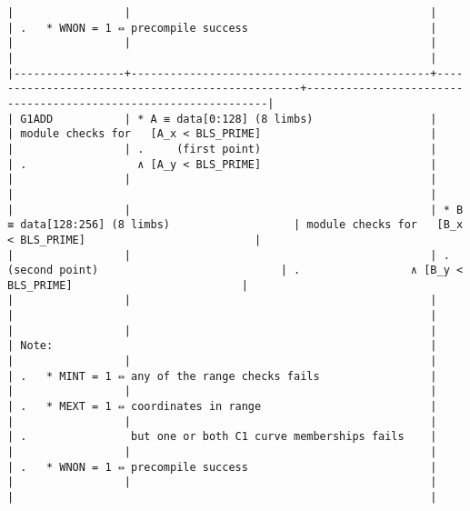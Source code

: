 \documentclass[varwidth=\maxdimen,margin=0.5cm,multi={verbatim}]{standalone}
\begin{document}
\begin{verbatim}
|                 |                                              |                                                 | .   * WNON = 1 ⇔ precompile success                            |
|                 |                                              |                                                 |                                                                |
|-----------------+----------------------------------------------+-------------------------------------------------+----------------------------------------------------------------|
| G1ADD           | * A ≡ data[0:128] (8 limbs)                  |                                                 | module checks for   [A_x < BLS_PRIME]                          |
|                 | .     (first point)                          |                                                 | .                 ∧ [A_y < BLS_PRIME]                          |
|                 |                                              |                                                 |                                                                |
|                 |                                              | * B ≡ data[128:256] (8 limbs)                   | module checks for   [B_x < BLS_PRIME]                          |
|                 |                                              | .     (second point)                            | .                 ∧ [B_y < BLS_PRIME]                          |
|                 |                                              |                                                 |                                                                |
|                 |                                              |                                                 | Note:                                                          |
|                 |                                              |                                                 | .   * MINT = 1 ⇔ any of the range checks fails                 |
|                 |                                              |                                                 | .   * MEXT = 1 ⇔ coordinates in range                          |
|                 |                                              |                                                 | .                but one or both C1 curve memberships fails    |
|                 |                                              |                                                 | .   * WNON = 1 ⇔ precompile success                            |
|                 |                                              |                                                 |                                                                |

\end{verbatim}
\end{document}
